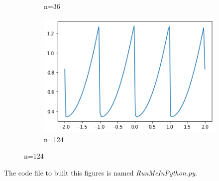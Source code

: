 \documentclass{article}
\begin{document}
\begin{figure}[h!]
\begin{subfigure}[b]{0.2\linewidth}
		\caption{n=36}
	\end{subfigure}
	\begin{subfigure}[b]{0.2\linewidth}
		\includegraphics[width=\linewidth]{img/f2_n124.png}
		\caption{n=124}
	\end{subfigure}
\end{figure}
\begin{center}
	The code file to built this figures is named \textit{RunMeInPython.py}.
\end{center}
\end{document}
